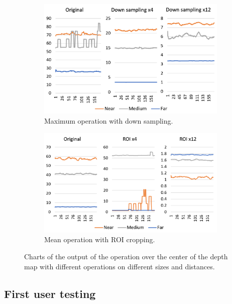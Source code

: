\documentclass[10pt,a4paper,twocolumn,twoside]{article}
\begin{document}
\begin{figure}
		\begin{subfigure}[t]{0.5\textwidth}
			\centering
			\includegraphics[width=\linewidth]{img/max2.png}
			\caption{Maximum operation with down sampling.\newline}
			\label{fig:output:max}
		\end{subfigure}

		\begin{subfigure}[t]{0.5\textwidth}
			\centering
			\includegraphics[width=\linewidth]{img/roimean2.png}
			\caption{Mean operation with ROI cropping.\newline}
			\label{fig:output:roicrop}
		\end{subfigure}
		\caption{ Charts of the output of the operation over the center of the depth map with different operations on different sizes and distances.}
		\label{fig:output}
	\end{figure}
	
	\subsection{First user testing}
	
\end{document}

